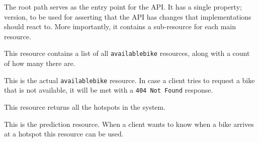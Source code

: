 {The root path serves as the entry point for the API.
It has a single property; version, to be used for asserting that the API has changes that implementations should react to.
More importantly, it contains a sub-resource for each main resource.}

{This resource contains a list of all \texttt{availablebike} resources, along with a count of how many there are.}


{This is the actual \texttt{availablebike} resource.
In case a client tries to request a bike that is not available, it will be met with a \texttt{404 Not Found} response.}


{This resource returns all the hotspots in the system.}



{This is the prediction resource.
When a client wants to know when a bike arrives at a hotspot this resource can be used.}



